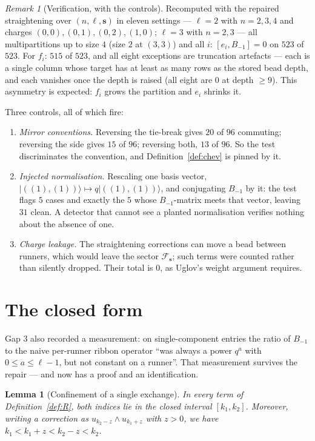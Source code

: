 \documentclass[11pt]{article}
\newtheorem{lemma}[theorem]{Lemma}
\theoremstyle{definition}
\theoremstyle{remark}
\newtheorem{remark}[theorem]{Remark}
\newcommand{\bs}{\mathbf{s}}
\newcommand{\ket}[1]{\lvert #1 \rangle}
\begin{document}
\begin{remark}[Verification, with the controls]\label{rem:verif-comm}
Recomputed with the repaired straightening over
$(n,\ell,\bs)$ in eleven settings --- $\ell=2$ with $n=2,3,4$ and charges
$(0,0),(0,1),(0,2),(1,0)$; $\ell=3$ with $n=2,3$ --- all multipartitions up to size $4$
(size $2$ at $(3,3)$) and all $i$: $[e_i,B_{-1}]=0$ on $523$ of $523$.
For $f_i$: $515$ of $523$, and all eight exceptions are truncation artefacts --- each is a
single column whose target has at least as many rows as the stored bead depth, and each
vanishes once the depth is raised (all eight are $0$ at depth $\ge9$). This asymmetry is
expected: $f_i$ grows the partition and $e_i$ shrinks it.

Three controls, all of which fire:
\begin{enumerate}
\item \emph{Mirror conventions.} Reversing the tie-break gives $20$ of $96$ commuting;
reversing the side gives $15$ of $96$; reversing both, $13$ of $96$. So the test
discriminates the convention, and Definition~\ref{def:chev} is pinned by it.
\item \emph{Injected normalisation.} Rescaling one basis vector,
$\ket{((1),(1))}\mapsto q\ket{((1),(1))}$, and conjugating $B_{-1}$ by it: the test
flags $5$ cases and exactly the $5$ whose $B_{-1}$-matrix meets that vector, leaving $31$
clean. A detector that cannot see a planted normalisation verifies nothing about the
absence of one.
\item \emph{Charge leakage.} The straightening corrections can move a bead between
runners, which would leave the sector $\mathcal F_{\bs}$; such terms were counted rather
than silently dropped. Their total is $0$, as Uglov's weight argument requires.
\end{enumerate}
\end{remark}

\section{The closed form}\label{sec:closed}

Gap 3 also recorded a measurement: on single-component entries the ratio of $B_{-1}$ to
the naive per-runner ribbon operator ``was always a power $q^{a}$ with $0\le a\le\ell-1$,
but not constant on a runner''. That measurement survives the repair --- and now has a
proof and an identification.

\begin{lemma}[Confinement of a single exchange]\label{lem:conf}
In every term of Definition~\ref{def:R}, both indices lie in the closed interval
$[k_1,k_2]$. Moreover, writing a correction as $u_{k_2-z}\wedge u_{k_1+z}$ with $z>0$, we
have $k_1<k_1+z<k_2-z<k_2$.
\end{lemma}
\end{document}
